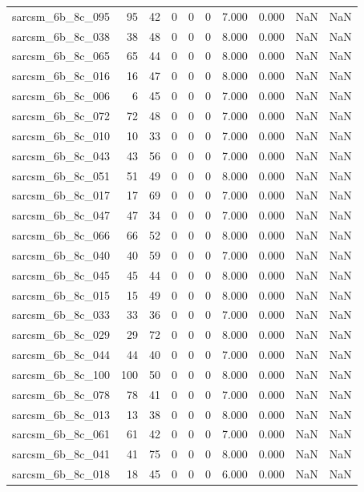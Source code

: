 \documentclass{article}
\begin{document}
\begin{longtable}{lrrrrrrrrr}
sarcsm\_6b\_8c\_095 & 95 & 42 & 0 & 0 & 0 & 7.000 & 0.000 & NaN & NaN \\
sarcsm\_6b\_8c\_038 & 38 & 48 & 0 & 0 & 0 & 8.000 & 0.000 & NaN & NaN \\
sarcsm\_6b\_8c\_065 & 65 & 44 & 0 & 0 & 0 & 8.000 & 0.000 & NaN & NaN \\
sarcsm\_6b\_8c\_016 & 16 & 47 & 0 & 0 & 0 & 8.000 & 0.000 & NaN & NaN \\
sarcsm\_6b\_8c\_006 & 6 & 45 & 0 & 0 & 0 & 7.000 & 0.000 & NaN & NaN \\
sarcsm\_6b\_8c\_072 & 72 & 48 & 0 & 0 & 0 & 7.000 & 0.000 & NaN & NaN \\
sarcsm\_6b\_8c\_010 & 10 & 33 & 0 & 0 & 0 & 7.000 & 0.000 & NaN & NaN \\
sarcsm\_6b\_8c\_043 & 43 & 56 & 0 & 0 & 0 & 7.000 & 0.000 & NaN & NaN \\
sarcsm\_6b\_8c\_051 & 51 & 49 & 0 & 0 & 0 & 8.000 & 0.000 & NaN & NaN \\
sarcsm\_6b\_8c\_017 & 17 & 69 & 0 & 0 & 0 & 7.000 & 0.000 & NaN & NaN \\
sarcsm\_6b\_8c\_047 & 47 & 34 & 0 & 0 & 0 & 7.000 & 0.000 & NaN & NaN \\
sarcsm\_6b\_8c\_066 & 66 & 52 & 0 & 0 & 0 & 8.000 & 0.000 & NaN & NaN \\
sarcsm\_6b\_8c\_040 & 40 & 59 & 0 & 0 & 0 & 7.000 & 0.000 & NaN & NaN \\
sarcsm\_6b\_8c\_045 & 45 & 44 & 0 & 0 & 0 & 8.000 & 0.000 & NaN & NaN \\
sarcsm\_6b\_8c\_015 & 15 & 49 & 0 & 0 & 0 & 8.000 & 0.000 & NaN & NaN \\
sarcsm\_6b\_8c\_033 & 33 & 36 & 0 & 0 & 0 & 7.000 & 0.000 & NaN & NaN \\
sarcsm\_6b\_8c\_029 & 29 & 72 & 0 & 0 & 0 & 8.000 & 0.000 & NaN & NaN \\
sarcsm\_6b\_8c\_044 & 44 & 40 & 0 & 0 & 0 & 7.000 & 0.000 & NaN & NaN \\
sarcsm\_6b\_8c\_100 & 100 & 50 & 0 & 0 & 0 & 8.000 & 0.000 & NaN & NaN \\
sarcsm\_6b\_8c\_078 & 78 & 41 & 0 & 0 & 0 & 7.000 & 0.000 & NaN & NaN \\
sarcsm\_6b\_8c\_013 & 13 & 38 & 0 & 0 & 0 & 8.000 & 0.000 & NaN & NaN \\
sarcsm\_6b\_8c\_061 & 61 & 42 & 0 & 0 & 0 & 7.000 & 0.000 & NaN & NaN \\
sarcsm\_6b\_8c\_041 & 41 & 75 & 0 & 0 & 0 & 8.000 & 0.000 & NaN & NaN \\
sarcsm\_6b\_8c\_018 & 18 & 45 & 0 & 0 & 0 & 6.000 & 0.000 & NaN & NaN \\

\end{longtable}
\end{document}
